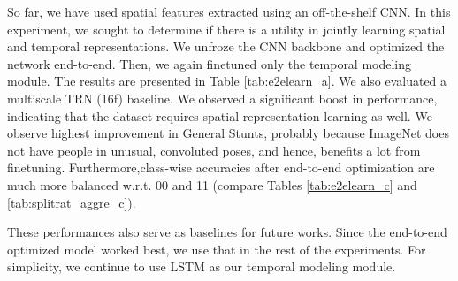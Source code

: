 \documentclass[final]{cvpr}
\begin{document}
\begin{table}[]
\label{tab:e2elearn}
\end{table} So far, we have used spatial features extracted using an off-the-shelf CNN. In this experiment, we sought to determine if there is a utility in jointly learning spatial and temporal representations. We unfroze the CNN backbone and optimized the network end-to-end. Then, we again finetuned only the temporal modeling module. The results are presented in Table \ref{tab:e2elearn_a}. We also evaluated a multiscale TRN (16f) baseline. We observed a significant boost in performance, indicating that the dataset requires spatial representation learning as well. We observe highest improvement in General Stunts, probably because ImageNet does not have people in unusual, convoluted poses, and hence, benefits a lot from finetuning. Furthermore,class-wise accuracies after end-to-end optimization are much more balanced w.r.t. 00 and 11 (compare Tables \ref{tab:e2elearn_c} and \ref{tab:splitrat_aggre_c}).

These performances also serve as baselines for future works. Since the end-to-end optimized model worked best, we use that in the rest of the experiments. For simplicity, we continue to use LSTM as our temporal modeling module.
\end{document}
